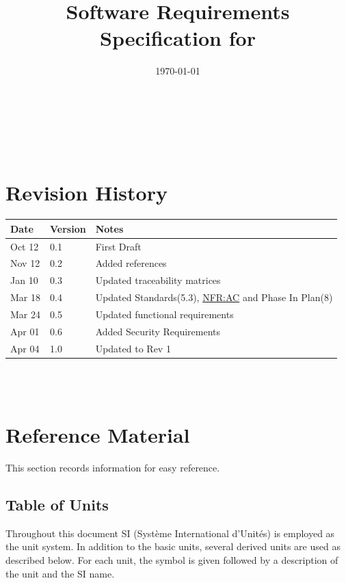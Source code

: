 \documentclass[12pt]{article}
\newcommand{\hpref}[1]{\hyperref[#1]{#1}}
\begin{document}
\title{Software Requirements Specification for \progname} 
\author{\authname}
\date{\today}
	
\maketitle

~\newpage


\tableofcontents

~\newpage

\section*{Revision History}

\begin{tabularx}{\textwidth}{p{3cm}p{2cm}X}
\toprule {\bf Date} & {\bf Version} & {\bf Notes}\\
\midrule
Oct 12 & 0.1 & First Draft\\
Nov 12 & 0.2 & Added references \\
Jan 10 & 0.3 & Updated traceability matrices \\
Mar 18 & 0.4 & Updated Standards(5.3), \hpref{NFR:AC} and Phase In Plan(8) \\
Mar 24 & 0.5 & Updated functional requirements \\
Apr 01 & 0.6 & Added Security Requirements \\
Apr 04 & 1.0 & Updated to Rev 1 \\
\bottomrule
\end{tabularx}

~\\

~\newpage

\section{Reference Material}

This section records information for easy reference.

\subsection{Table of Units}

Throughout this document SI (Syst\`{e}me International d'Unit\'{e}s) is employed
as the unit system.  In addition to the basic units, several derived units are
used as described below.  For each unit, the symbol is given followed by a
description of the unit and the SI name.
~\newline
\end{document}
